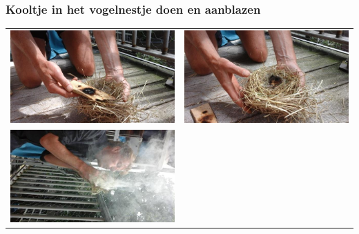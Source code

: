 \documentclass[a4paper, handout]{beamer}
\begin{document}
\begin{frame}
\begin{tabular}{ c c }
		\\
	\end{tabular}
\end{frame}

\begin{frame}
	\frametitle{Kooltje in het vogelnestje doen en aanblazen}
	\begin{tabular}{ c c }
		\includegraphics[scale=0.2]{blazen-1}
		&
		\includegraphics[scale=0.2]{blazen-2}
		\\
		\includegraphics[scale=0.2]{blazen-3}

\end{tabular}
\end{frame}
\end{document}
